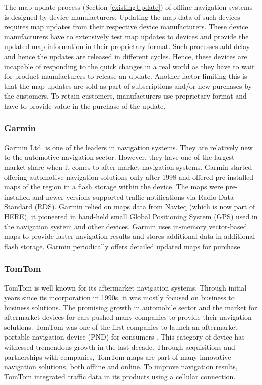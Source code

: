The map update process (Section \ref{existingUpdate}) of offline navigation systems is designed by device manufacturers. Updating the map data of such devices requires map updates from their respective device manufacturers. These device manufacturers have to extensively test map updates to devices and provide the updated map information in their proprietary format. Such processes add delay and hence the updates are released in different cycles. Hence, these devices are incapable of responding to the quick changes in a real world as they have to wait for product manufacturers to release an update. Another factor limiting this is that the map updates are sold as part of subscriptions and/or new purchases by the customers. To retain customers, manufacturers use proprietary format and have to provide value in the purchase of the update.  
 
\subsubsection{Garmin}
Garmin Ltd. is one of the leaders in navigation systems. They are relatively new to the automotive navigation sector. However, they have one of the largest market share when it comes to after-market navigation systems. Garmin started offering automotive navigation solutions only after 1998 and offered pre-installed maps of the region in a flash storage within the device. The maps were pre-installed and newer versions supported traffic notifications via Radio Data Standard (RDS). Garmin relied on maps data from Navteq (which is now part of HERE), it pioneered in hand-held small Global Positioning System (GPS) used in the navigation system and other devices. Garmin uses in-memory vector-based maps to provide faster navigation results and stores additional data in additional flash storage. Garmin periodically offers detailed updated maps for purchase.
\subsubsection{TomTom}
TomTom is well known for its aftermarket navigation systems. Through initial years since its incorporation in 1990s, it was mostly focused on business to business solutions. The promising growth in automobile sector and the market for aftermarket devices for cars pushed many companies to provide their navigation solutions. TomTom was one of the first companies to launch an aftermarket portable navigation device (PND) for consumers \cite{tomtomhistory}. This category of device has witnessed tremendous growth in the last decade. Through acquisitions and partnerships with companies, TomTom maps are part of many innovative navigation solutions, both offline and online. To improve navigation results, TomTom integrated traffic data in its products using a cellular connection. 


